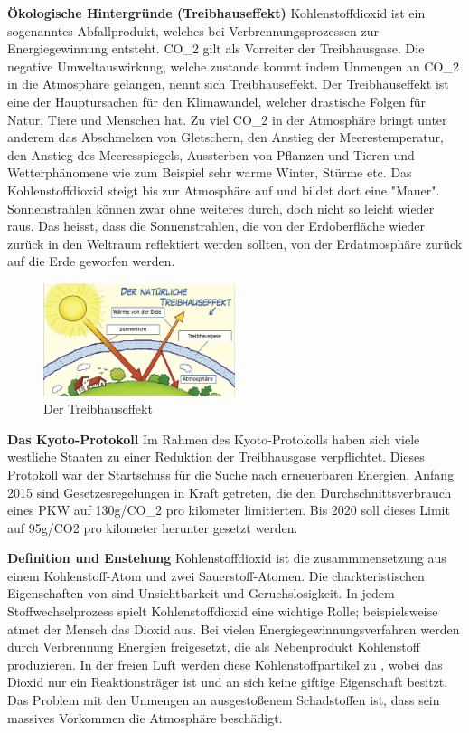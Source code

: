 \textbf{Ökologische Hintergründe (Treibhauseffekt)}
Kohlenstoffdioxid ist ein sogenanntes Abfallprodukt, welches bei Verbrennungsprozessen zur Energiegewinnung entsteht. 
CO_{2} gilt als Vorreiter der Treibhausgase.
Die negative Umweltauswirkung, welche zustande kommt indem Unmengen an CO_{2} in die Atmosphäre gelangen, 
nennt sich Treibhauseffekt. 
Der Treibhauseffekt ist eine der Hauptursachen für den Klimawandel, welcher drastische Folgen für Natur, Tiere und Menschen hat. 
Zu viel CO_{2} in der Atmosphäre bringt unter anderem das Abschmelzen von Gletschern, 
den Anstieg der Meerestemperatur, den Anstieg des Meeresspiegels, 
Aussterben von Pflanzen und Tieren und Wetterphänomene wie zum Beispiel sehr warme Winter, Stürme etc.
Das Kohlenstoffdioxid steigt bis zur Atmosphäre auf und bildet dort eine "Mauer".
Sonnenstrahlen können zwar ohne weiteres durch, doch nicht so leicht wieder raus. Das heisst, dass die Sonnenstrahlen,
die von der Erdoberfläche wieder zurück in den Weltraum reflektiert werden sollten, von der Erdatmosphäre zurück auf die Erde geworfen werden. 

\begin{figure}[!htb]\centering
	\includegraphics[width=0.5\textwidth]{images/treibhaus1}
	\caption{Der Treibhauseffekt \cite{BOZH.ch1-co2-umwelt.treibhaus1}}\label{Fig:Data3}
\end{figure}
 
\textbf{Das Kyoto-Protokoll}
Im Rahmen des Kyoto-Protokolls haben sich viele westliche Staaten zu einer Reduktion der Treibhausgase verpflichtet. 
Dieses Protokoll war der Startschuss für die Suche nach erneuerbaren Energien. 
Anfang 2015 sind Gesetzesregelungen in Kraft getreten, die den Durchschnittsverbrauch eines PKW auf 130g/CO_{2} pro kilometer limitierten. 
Bis 2020 soll dieses Limit auf 95g/CO2 pro kilometer herunter gesetzt werden.

\textbf{Definition und Enstehung\nextline}
Kohlenstoffdioxid ist die zusammmensetzung aus einem Kohlenstoff-Atom und zwei Sauerstoff-Atomen. Die charkteristischen Eigenschaften von  sind Unsichtbarkeit und Geruchslosigkeit. In jedem Stoffwechselprozess spielt Kohlenstoffdioxid eine wichtige Rolle; beispielsweise atmet der Mensch das Dioxid aus. Bei vielen Energiegewinnungsverfahren werden durch Verbrennung Energien freigesetzt, die als Nebenprodukt Kohlenstoff produzieren. In der freien Luft werden diese Kohlenstoffpartikel zu , wobei das Dioxid nur ein Reaktionsträger ist und an sich keine giftige Eigenschaft besitzt. Das Problem mit den Unmengen an ausgestoßenem Schadstoffen ist, dass sein massives Vorkommen die Atmosphäre beschädigt.

